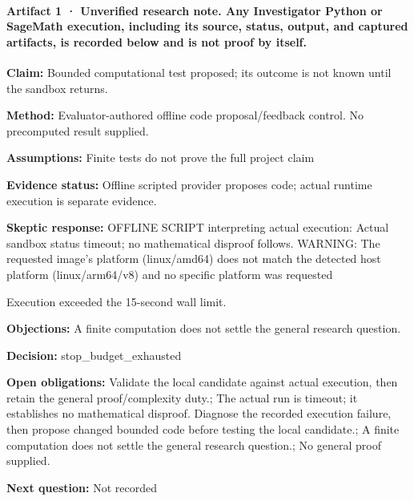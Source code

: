 \documentclass[11pt]{article}
\begin{document}
\paragraph{Artifact 1 · Unverified research note. Any Investigator Python or SageMath execution, including its source, status, output, and captured artifacts, is recorded below and is not proof by itself.}
\textbf{Claim:} Bounded computational test proposed; its outcome is not known until the sandbox returns.\par
\textbf{Method:} Evaluator-authored offline code proposal/feedback control. No precomputed result supplied.\par
\textbf{Assumptions:} Finite tests do not prove the full project claim\par
\textbf{Evidence status:} Offline scripted provider proposes code; actual runtime execution is separate evidence.\par
\textbf{Skeptic response:} OFFLINE SCRIPT interpreting actual execution: Actual sandbox status timeout; no mathematical disproof follows. WARNING: The requested image's platform (linux/amd64) does not match the detected host platform (linux/arm64/v8) and no specific platform was requested

Execution exceeded the 15-second wall limit.\par
\textbf{Objections:} A finite computation does not settle the general research question.\par
\textbf{Decision:} stop\_budget\_exhausted\par
\textbf{Open obligations:} Validate the local candidate against actual execution, then retain the general proof/complexity duty.; The actual run is timeout; it establishes no mathematical disproof. Diagnose the recorded execution failure, then propose changed bounded code before testing the local candidate.; A finite computation does not settle the general research question.; No general proof supplied.\par
\textbf{Next question:} Not recorded\par
\end{document}
